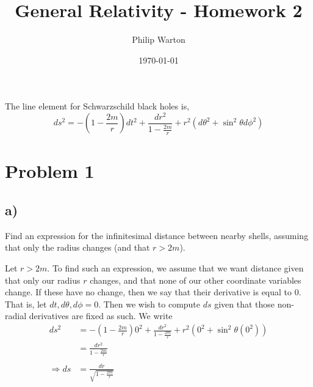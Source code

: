 \documentclass{article}
\theoremstyle{definition}
\begin{document}
\title{General Relativity - Homework 2}
\author{Philip Warton}
\date{\today}
\maketitle
The line element for Schwarzschild black holes is,
\[
    ds^2 = -\left(1 - \frac{2m}{r}\right)dt^2 + \frac{dr^2}{1-\frac{2m}{r}} + r^2(d\theta^2 + \sin^2\theta d\phi^2)
\]
\section*{Problem 1}
\subsection*{a)}
\begin{mdframed}
    Find an expression for the infinitesimal distance between nearby shells, assuming that only the radius changes (and that $r > 2m$).
\end{mdframed}
Let $r > 2m$. To find such an expression, we assume that we want distance given that only our radius $r$ changes, and that none of our other coordinate variables change.
If these have no change, then we say that their derivative is equal to 0.
That is, let $dt, d\theta, d\phi = 0$. Then we wish to compute $ds$ given that those non-radial derivatives are fixed as such. We write 
\begin{align*}
    ds^2 &=  -\left(1 - \frac{2m}{r}\right)0^2 + \frac{dr^2}{1-\frac{2m}{r}} + r^2(0^2 + \sin^2\theta (0^2))\\
    &= \frac{dr^2}{1-\frac{2m}{r}}\\\\
    \Longrightarrow ds &= \frac{dr}{\sqrt{1-\frac{2m}{r}}}
\end{align*}
\end{document}
